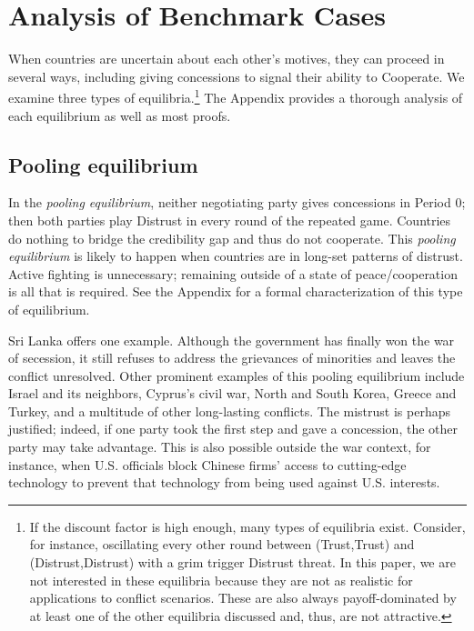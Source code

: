 \documentclass[bibtex,autowc]{apsr_submission}
\begin{document}
\section{Analysis of Benchmark Cases}
\label{sec:bench}
When countries are uncertain about each other's motives, they can proceed in several ways, including giving concessions to signal their ability to Cooperate. We examine three types of equilibria.\footnote{If the discount factor is high enough, many types of equilibria exist. Consider, for instance, oscillating every other round between (Trust,Trust) and (Distrust,Distrust) with a grim trigger Distrust threat. In this paper, we are not interested in these equilibria because they are not as realistic for applications to conflict scenarios. These are also always payoff-dominated by at least one of the other equilibria discussed and, thus, are not attractive.} The Appendix provides a thorough analysis of each equilibrium as well as most proofs. 

\subsection{Pooling equilibrium}
In the \emph{pooling equilibrium}, neither negotiating party gives concessions in Period 0; then both parties play Distrust in every round of the repeated game. Countries do nothing to bridge the credibility gap and thus do not cooperate. This \emph{pooling equilibrium} is likely to happen when countries are in long-set patterns of distrust. Active fighting is unnecessary; remaining outside of a state of peace/cooperation is all that is required. See the Appendix for a formal characterization of this type of equilibrium. 


Sri Lanka offers one example. Although the government has finally won the war of secession, it still refuses to address the grievances of minorities and leaves the conflict unresolved. Other prominent examples of this pooling equilibrium include Israel and its neighbors, Cyprus's civil war, North and South Korea, Greece and Turkey, and a multitude of other long-lasting conflicts. The mistrust is perhaps justified; indeed, if one party took the first step and gave a concession, the other party may take advantage. This is also possible outside the war context, for instance, when U.S. officials block Chinese firms' access to cutting-edge technology to prevent that technology from being used against U.S. interests.
\end{document}
